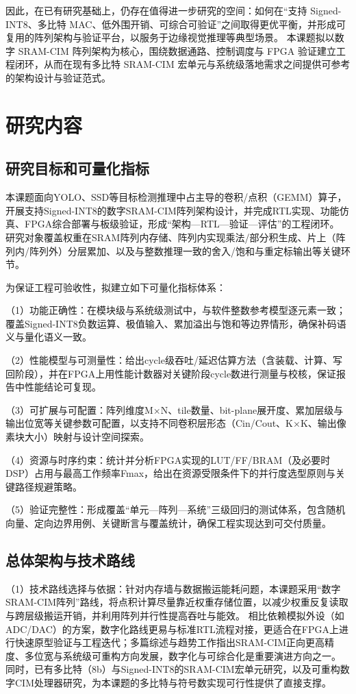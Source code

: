 \documentclass[12pt, a4paper]{article}
\begin{document}
因此，在已有研究基础上，仍存在值得进一步研究的空间：如何在“支持 Signed-INT8、多比特 MAC、低外围开销、可综合可验证”之间取得更优平衡，并形成可复用的阵列架构与验证平台，以服务于边缘视觉推理等典型场景。\cite{5}\cite{6}\cite{12}\cite{24} 本课题拟以数字 SRAM-CIM 阵列架构为核心，围绕数据通路、控制调度与 FPGA 验证建立工程闭环，从而在现有多比特 SRAM-CIM 宏单元与系统级落地需求之间提供可参考的架构设计与验证范式。\cite{5}\cite{12}\cite{24}

\section{研究内容}
\subsection{研究目标和可量化指标}
本课题面向YOLO、SSD等目标检测推理中占主导的卷积/点积（GEMM）算子，开展支持Signed-INT8的数字SRAM-CIM阵列架构设计，并完成RTL实现、功能仿真、FPGA综合部署与板级验证，形成“架构—RTL—验证—评估”的工程闭环。\cite{10}\cite{11}\cite{3} 研究对象覆盖权重在SRAM阵列内存储、阵列内实现乘法/部分积生成、片上（阵列内/阵列外）分层累加、以及与整数推理一致的舍入/饱和与重定标输出等关键环节。\cite{4}\cite{5}\cite{12}\cite{6}


为保证工程可验收性，拟建立如下可量化指标体系：


（1）功能正确性：在模块级与系统级测试中，与软件整数参考模型逐元素一致；覆盖Signed-INT8负数运算、极值输入、累加溢出与饱和等边界情形，确保补码语义与量化语义一致。\cite{6}\cite{28}\cite{29}


（2）性能模型与可测量性：给出cycle级吞吐/延迟估算方法（含装载、计算、写回阶段），并在FPGA上用性能计数器对关键阶段cycle数进行测量与校核，保证报告中性能结论可复现。\cite{3}\cite{24}\cite{25}


（3）可扩展与可配置：阵列维度M×N、tile数量、bit-plane展开度、累加层级与输出位宽等关键参数可配置，以支持不同卷积层形态（Cin/Cout、K×K、输出像素块大小）映射与设计空间探索。\cite{12}\cite{23}\cite{24}


（4）资源与时序约束：统计并分析FPGA实现的LUT/FF/BRAM（及必要时DSP）占用与最高工作频率Fmax，给出在资源受限条件下的并行度选型原则与关键路径规避策略。\cite{24}\cite{25}


（5）验证完整性：形成覆盖“单元—阵列—系统”三级回归的测试体系，包含随机向量、定向边界用例、关键断言与覆盖统计，确保工程实现达到可交付质量。\cite{12}\cite{16}

\subsection{总体架构与技术路线}
（1）技术路线选择与依据：针对内存墙与数据搬运能耗问题，本课题采用“数字SRAM-CIM阵列”路线，将点积计算尽量靠近权重存储位置，以减少权重反复读取与跨层级搬运开销，并利用阵列并行性提高吞吐与能效。\cite{2}\cite{4}\cite{5} 相比依赖模拟外设（如ADC/DAC）的方案，数字化路线更易与标准RTL流程对接，更适合在FPGA上进行快速原型验证与工程迭代；多篇综述与趋势工作指出SRAM-CIM正向更高精度、多位宽与系统级可重构方向发展，数字化与可综合化是重要演进方向之一。\cite{12}\cite{13}\cite{14} 同时，已有多比特（8b）与Signed-INT8的SRAM-CIM宏单元研究，以及可重构数字CIM处理器研究，为本课题的多比特与符号数实现可行性提供了直接支撑。\cite{7}\cite{8}\cite{9}\cite{24}\cite{25}
\end{document}
